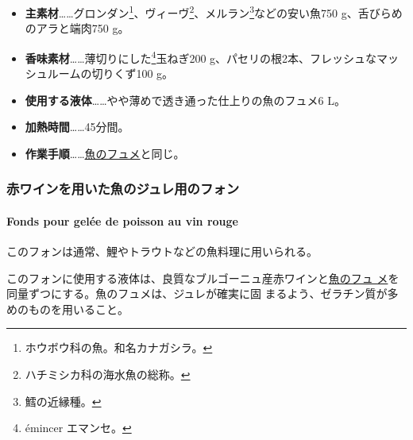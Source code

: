 \begin{recette}
\begin{itemize}
\item
  \textbf{主素材}\ldots{}\ldots{}グロンダン\footnote{ホウボウ科の魚。和名カナガシラ。}、ヴィーヴ\footnote{ハチミシカ科の海水魚の総称。}、メルラン\footnote{鱈の近縁種。}などの安い魚750
  g、舌びらめのアラと端肉750 g。
\item
  \textbf{香味素材}\ldots{}\ldots{}薄切りにした\footnote{émincer
    エマンセ。}玉ねぎ200
  g、パセリの根2本、フレッシュなマッシュルームの切りくず100 g。
\item
  \textbf{使用する液体}\ldots{}\ldots{}やや薄めで透き通った仕上りの魚のフュメ6
  L。
\item
  \textbf{加熱時間}\ldots{}\ldots{}45分間。
\item
  \textbf{作業手順}\ldots{}\ldots{}\protect\hyperlink{fumet-de-poisson}{魚のフュメ}と同じ。
\end{itemize}

\maeaki

\hypertarget{ux8d64ux30efux30a4ux30f3ux3092ux7528ux3044ux305fux9b5aux306eux30b8ux30e5ux30ecux7528ux306eux30d5ux30a9ux30f3}{%
\subsubsection{赤ワインを用いた魚のジュレ用のフォン}\label{ux8d64ux30efux30a4ux30f3ux3092ux7528ux3044ux305fux9b5aux306eux30b8ux30e5ux30ecux7528ux306eux30d5ux30a9ux30f3}}

\hypertarget{fonds-pour-gelee-de-poisson-au-vin-rouge}{%
\paragraph{Fonds pour gelée de poisson au vin
rouge}\label{fonds-pour-gelee-de-poisson-au-vin-rouge}}


このフォンは通常、鯉やトラウトなどの魚料理に用いられる。

このフォンに使用する液体は、良質なブルゴーニュ産赤ワインと\protect\hyperlink{fumet-de-poisson}{魚のフュ
メ}を同量ずつにする。魚のフュメは、ジュレが確実に固
まるよう、ゼラチン質が多めのものを用いること。


\end{recette}
